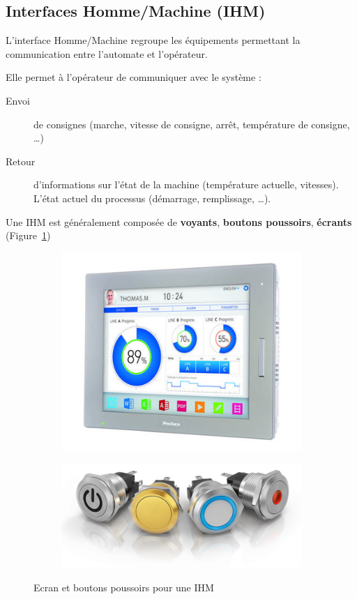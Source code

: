 \subsection{Interfaces Homme/Machine (IHM)}
L'interface Homme/Machine regroupe les équipements permettant la communication entre l'automate et l'opérateur.

 Elle permet à l'opérateur de communiquer avec le système :
 \begin{description}
   \item [Envoi] de consignes (marche, vitesse de consigne, arrêt, température de consigne, \dots)
   \item [Retour] d'informations sur l'état de la machine (température actuelle, vitesses). L'état actuel du processus (démarrage, remplissage, \dots).
 \end{description}

 Une IHM est généralement composée de \textbf{voyants}, \textbf{boutons poussoirs}, \textbf{écrants} (Figure~\ref{fig:IHM})


\begin{figure}
  \begin{subfigure}{0.49\textwidth}
    \centering
    \includegraphics[width=\linewidth, height=.15\textheight,keepaspectratio]{images/ecranIHM}
  \end{subfigure}%
%
  \begin{subfigure}{0.49\textwidth}
    \centering
    \includegraphics[width=\linewidth,height=.15\textheight,keepaspectratio]{images/boutons}
  \end{subfigure}
  \caption{Ecran et boutons poussoirs pour une IHM}
  \label{fig:IHM}
\end{figure}


